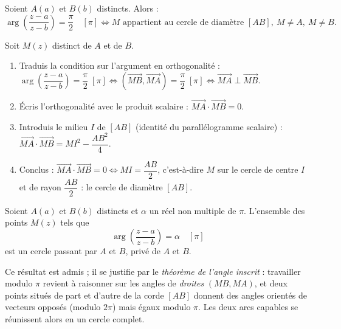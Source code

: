\documentclass[11pt]{article}
\newcommand{\cle}[1]{{\popxbold\color{popdark}#1}}
\begin{document}
\begin{propriete}
Soient $A(a)$ et $B(b)$ distincts. Alors :
\[
\arg\left(\frac{z-a}{z-b}\right) = \frac{\pi}{2} \quad [\pi] \iff M \text{ appartient au cercle de diamètre } [AB],\ M \neq A,\ M \neq B.
\]
\end{propriete}

\begin{experience}
Soit $M(z)$ distinct de $A$ et de $B$.
\begin{enumerate}
\item Traduis la condition sur l'argument en orthogonalité : $\arg\left(\dfrac{z-a}{z-b}\right) = \dfrac{\pi}{2}\;[\pi] \iff (\overrightarrow{MB}, \overrightarrow{MA}) = \dfrac{\pi}{2}\;[\pi] \iff \overrightarrow{MA} \perp \overrightarrow{MB}$.
\item Écris l'orthogonalité avec le produit scalaire : $\overrightarrow{MA} \cdot \overrightarrow{MB} = 0$.
\item Introduis le milieu $I$ de $[AB]$ (identité du parallélogramme scalaire) : $\overrightarrow{MA} \cdot \overrightarrow{MB} = MI^2 - \dfrac{AB^2}{4}$.
\item Conclus : $\overrightarrow{MA} \cdot \overrightarrow{MB} = 0 \iff MI = \dfrac{AB}{2}$, c'est-à-dire $M$ sur le cercle de centre $I$ et de rayon $\dfrac{AB}{2}$ : le cercle de diamètre $[AB]$.
\end{enumerate}
\end{experience}

\begin{propriete}
Soient $A(a)$ et $B(b)$ distincts et $\alpha$ un réel non multiple de $\pi$. L'ensemble des points $M(z)$ tels que
\[
\arg\left(\frac{z-a}{z-b}\right) = \alpha \quad [\pi]
\]
est un \cle{cercle passant par $A$ et $B$}, privé de $A$ et $B$.
\end{propriete}

Ce résultat est admis ; il se justifie par le \emph{théorème de l'angle inscrit} : travailler modulo $\pi$ revient à raisonner sur les angles de \emph{droites} $(MB, MA)$, et deux points situés de part et d'autre de la corde $[AB]$ donnent des angles orientés de vecteurs opposés (modulo $2\pi$) mais égaux modulo $\pi$. Les deux arcs capables se réunissent alors en un cercle complet.
\end{document}
